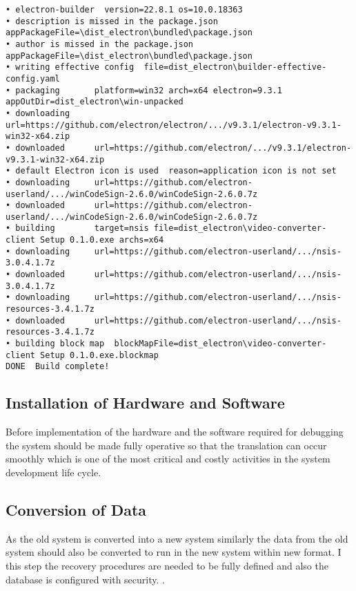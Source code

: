 \begin{verbatim}
• electron-builder  version=22.8.1 os=10.0.18363
• description is missed in the package.json  appPackageFile=\dist_electron\bundled\package.json
• author is missed in the package.json  appPackageFile=\dist_electron\bundled\package.json
• writing effective config  file=dist_electron\builder-effective-config.yaml
• packaging       platform=win32 arch=x64 electron=9.3.1 appOutDir=dist_electron\win-unpacked
• downloading     url=https://github.com/electron/electron/.../v9.3.1/electron-v9.3.1-win32-x64.zip
• downloaded      url=https://github.com/electron/.../v9.3.1/electron-v9.3.1-win32-x64.zip
• default Electron icon is used  reason=application icon is not set
• downloading     url=https://github.com/electron-userland/.../winCodeSign-2.6.0/winCodeSign-2.6.0.7z
• downloaded      url=https://github.com/electron-userland/.../winCodeSign-2.6.0/winCodeSign-2.6.0.7z
• building        target=nsis file=dist_electron\video-converter-client Setup 0.1.0.exe archs=x64
• downloading     url=https://github.com/electron-userland/.../nsis-3.0.4.1.7z
• downloaded      url=https://github.com/electron-userland/.../nsis-3.0.4.1.7z
• downloading     url=https://github.com/electron-userland/.../nsis-resources-3.4.1.7z
• downloaded      url=https://github.com/electron-userland/.../nsis-resources-3.4.1.7z
• building block map  blockMapFile=dist_electron\video-converter-client Setup 0.1.0.exe.blockmap
DONE  Build complete!
\end{verbatim}
		\subsection{Installation of Hardware and Software}
		\hspace{1cm}Before implementation of the hardware and the software required for debugging the system should be made fully operative so that the translation can occur smoothly which is one of the most critical and costly activities in the system development life cycle.
		
		\subsection{Conversion of Data}
		\hspace{1cm}As the old system is converted into a new system similarly the data from the old system should also be converted to run in the new system within new format. I this step the recovery procedures are needed to be fully defined and also the database is configured with security. .
		
